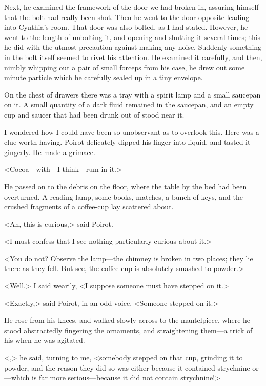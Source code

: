  Next, he examined the framework of the door we had broken in, assuring himself that the bolt had really been shot. Then he went to the door opposite leading into Cynthia's room. That door was also bolted, as I had stated. However, he went to the length of unbolting it, and opening and shutting it several times; this he did with the utmost precaution against making any noise. Suddenly something in the bolt itself seemed to rivet his attention. He examined it carefully, and then, nimbly whipping out a pair of small forceps from his case, he drew out some minute particle which he carefully sealed up in a tiny envelope. 

 On the chest of drawers there was a tray with a spirit lamp and a small saucepan on it. A small quantity of a dark fluid remained in the saucepan, and an empty cup and saucer that had been drunk out of stood near it. 

 I wondered how I could have been so unobservant as to overlook this. Here was a clue worth having. Poirot delicately dipped his finger into liquid, and tasted it gingerly. He made a grimace. 

 <Cocoa—with—I think—rum in it.> 

 He passed on to the debris on the floor, where the table by the bed had been overturned. A reading-lamp, some books, matches, a bunch of keys, and the crushed fragments of a coffee-cup lay scattered about. 

 <Ah, this is curious,> said Poirot. 

 <I must confess that I see nothing particularly curious about it.> 

 <You do not? Observe the lamp—the chimney is broken in two places; they lie there as they fell. But see, the coffee-cup is absolutely smashed to powder.> 

 <Well,> I said wearily, <I suppose someone must have stepped on it.> 

 <Exactly,> said Poirot, in an odd voice. <Someone stepped on it.> 

 He rose from his knees, and walked slowly across to the mantelpiece, where he stood abstractedly fingering the ornaments, and straightening them—a trick of his when he was agitated. 

 <,> he said, turning to me, <somebody stepped on that cup, grinding it to powder, and the reason they did so was either because it contained strychnine or—which is far more serious—because it did not contain strychnine!> 

